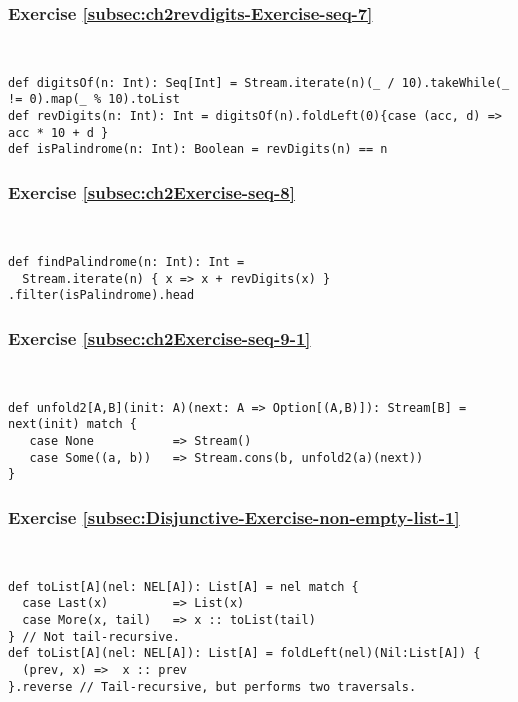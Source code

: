 \subsubsection*{Exercise \ref{subsec:ch2revdigits-Exercise-seq-7}}

~
\begin{lstlisting}
def digitsOf(n: Int): Seq[Int] = Stream.iterate(n)(_ / 10).takeWhile(_ != 0).map(_ % 10).toList
def revDigits(n: Int): Int = digitsOf(n).foldLeft(0){case (acc, d) => acc * 10 + d }
def isPalindrome(n: Int): Boolean = revDigits(n) == n
\end{lstlisting}


\subsubsection*{Exercise \ref{subsec:ch2Exercise-seq-8}}

~
\begin{lstlisting}
def findPalindrome(n: Int): Int = 
  Stream.iterate(n) { x => x + revDigits(x) } .filter(isPalindrome).head
\end{lstlisting}


\subsubsection*{Exercise \ref{subsec:ch2Exercise-seq-9-1}}

~
\begin{lstlisting}
def unfold2[A,B](init: A)(next: A => Option[(A,B)]): Stream[B] = next(init) match {
   case None           => Stream()
   case Some((a, b))   => Stream.cons(b, unfold2(a)(next))
}
\end{lstlisting}



\subsubsection*{Exercise \ref{subsec:Disjunctive-Exercise-non-empty-list-1}}

~
\begin{lstlisting}
def toList[A](nel: NEL[A]): List[A] = nel match {
  case Last(x)         => List(x)
  case More(x, tail)   => x :: toList(tail)
} // Not tail-recursive.
def toList[A](nel: NEL[A]): List[A] = foldLeft(nel)(Nil:List[A]) {
  (prev, x) =>  x :: prev
}.reverse // Tail-recursive, but performs two traversals.
\end{lstlisting}


